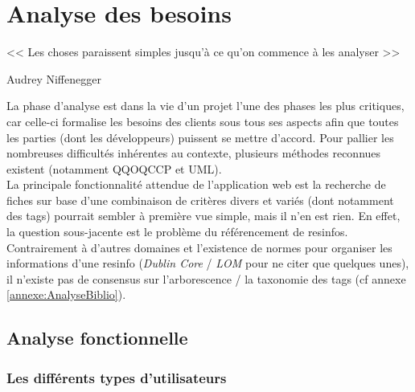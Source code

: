 
\chapter{Analyse des besoins}

\epigraph{<< Les choses paraissent simples jusqu'à ce qu'on commence à les analyser >>}{Audrey Niffenegger}

La phase d'analyse est dans la vie d'un projet l'une des phases les plus critiques, car celle-ci formalise les besoins des clients sous tous ses aspects afin que toutes les parties (dont les développeurs) puissent se mettre d'accord. Pour pallier les nombreuses difficultés inhérentes au contexte, plusieurs méthodes reconnues existent (notamment \Gls{QQOQCCP} et UML). \\

La principale fonctionnalité attendue de l'application web est la recherche de \glspl{fiche} sur base d'une combinaison de critères divers et variés (dont notamment des \glspl{tag}) pourrait sembler à première vue simple, mais il n'en est rien. En effet, la question sous-jacente est le problème du référencement de \glspl{resinfo}. Contrairement à d'autres domaines et l'existence de normes pour organiser les informations d'une \gls{resinfo} (\textit{Dublin Core} / \textit{LOM} pour ne citer que quelques unes), il n'existe pas de consensus sur l'arborescence / la taxonomie des \glspl{tag} (cf annexe \ref{annexe:AnalyseBiblio}).

\section{Analyse fonctionnelle}
\label{section:analyseFonctionnelle}

\subsection*{Les différents types d'utilisateurs}



